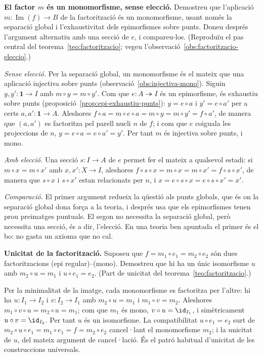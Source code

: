 \begin{exercici}
\textbf{El factor \(m\) és un monomorfisme, sense elecció.} Demostreu que l'aplicació \(m\colon\operatorname{Im}(f)\to B\) de la factorització és un monomorfisme, usant només la separació global i l'exhaustivitat dels epimorfismes sobre punts. Doneu després l'argument alternatiu amb una secció de \(e\), i compareu-los. (Reproduïu el pas central del teorema~\ref{teo:factoritzacio}; vegeu l'observació~\ref{obs:factoritzacio-eleccio}.)
\end{exercici}
\begin{solucio}
\emph{Sense elecció.} Per la separació global, un monomorfisme és el mateix que una aplicació injectiva sobre punts (observació~\ref{obs:injectiva-mono}). Siguin \(y,y'\colon\mathbf1\to I\) amb \(m\circ y=m\circ y'\). Com que \(e\colon A\twoheadrightarrow I\) és un epimorfisme, és exhaustiu sobre punts (proposició~\ref{prop:epi-exhaustiu-punts}): \(y=e\circ a\) i \(y'=e\circ a'\) per a certs \(a,a'\colon\mathbf1\to A\). Aleshores \(f\circ a=m\circ e\circ a=m\circ y=m\circ y'=f\circ a'\), de manera que \((a,a')\) es factoritza pel parell nucli \(n\) de \(f\); i com que \(e\) coiguala les projeccions de \(n\), \(y=e\circ a=e\circ a'=y'\). Per tant \(m\) és injectiva sobre punts, i mono.

\emph{Amb elecció.} Una secció \(s\colon I\to A\) de \(e\) permet fer el mateix a qualsevol estadi: si \(m\circ x=m\circ x'\) amb \(x,x'\colon X\to I\), aleshores \(f\circ s\circ x=m\circ x=m\circ x'=f\circ s\circ x'\), de manera que \(s\circ x\) i \(s\circ x'\) estan relacionats per \(n\), i \(x=e\circ s\circ x=e\circ s\circ x'=x'\).

\emph{Comparació.} El primer argument redueix la qüestió als punts globals, que és on la separació global dona força a la teoria, i després usa que els epimorfismes tenen prou preimatges puntuals. El segon no necessita la separació global, però necessita una secció, és a dir, l'elecció. En una teoria ben apuntada el primer és el bo: no gasta un axioma que no cal.
\end{solucio}

\begin{exercici}
\textbf{Unicitat de la factorització.} Suposeu que \(f=m_1\circ e_1=m_2\circ e_2\) són dues factoritzacions (epi regular)--(mono). Demostreu que hi ha un únic isomorfisme \(u\) amb \(m_2\circ u=m_1\) i \(u\circ e_1=e_2\). (Part de unicitat del teorema~\ref{teo:factoritzacio}.)
\end{exercici}
\begin{solucio}
Per la minimalitat de la imatge, cada monomorfisme es factoritza per l'altre: hi ha \(u\colon I_1\to I_2\) i \(v\colon I_2\to I_1\) amb \(m_2\circ u=m_1\) i \(m_1\circ v=m_2\). Aleshores \(m_1\circ v\circ u=m_2\circ u=m_1\); com que \(m_1\) és mono, \(v\circ u=\id_{I_1}\), i simètricament \(u\circ v=\id_{I_2}\). Per tant \(u\) és un isomorfisme. La compatibilitat \(u\circ e_1=e_2\) surt de \(m_2\circ u\circ e_1=m_1\circ e_1=f=m_2\circ e_2\) cancel·lant el monomorfisme \(m_2\); i la unicitat de \(u\), del mateix argument de cancel·lació. És el patró habitual d'unicitat de les construccions universals.
\end{solucio}

